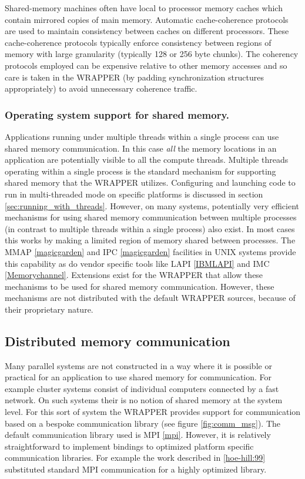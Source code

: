 Shared-memory machines often have local to processor memory caches
which contain mirrored copies of main memory. Automatic cache-coherence
protocols are used to maintain consistency between caches on different
processors. These cache-coherence protocols typically enforce consistency
between regions of memory with large granularity (typically 128 or 256 byte
chunks). The coherency protocols employed can be expensive relative to other
memory accesses and so care is taken in the WRAPPER (by padding synchronization
structures appropriately) to avoid unnecessary coherence traffic.

\subsubsection{Operating system support for shared memory.}

Applications running under multiple threads within a single process can
use shared memory communication. In this case {\it all} the memory locations 
in an application are potentially visible to all the compute threads. Multiple 
threads operating within a single process is the standard mechanism for 
supporting shared memory that the WRAPPER utilizes. Configuring and launching 
code to run in multi-threaded mode on specific platforms is discussed in 
section \ref{sec:running_with_threads}.  However, on many systems, potentially 
very efficient mechanisms for using shared memory communication between 
multiple processes (in contrast to multiple threads within a single 
process) also exist. In most cases this works by making a limited region of 
memory shared between processes. The MMAP \ref{magicgarden} and 
IPC \ref{magicgarden} facilities in UNIX systems provide this capability as do 
vendor specific tools like LAPI \ref{IBMLAPI} and IMC \ref{Memorychannel}. 
Extensions exist for the WRAPPER that allow these mechanisms 
to be used for shared memory communication. However, these mechanisms are not 
distributed with the default WRAPPER sources, because of their proprietary 
nature.

\subsection{Distributed memory communication}
\label{sec:distributed_memory_communication}
Many parallel systems are not constructed in a way where it is
possible or practical for an application to use shared memory
for communication. For example cluster systems consist of individual computers
connected by a fast network. On such systems their is no notion of shared memory
at the system level. For this sort of system the WRAPPER provides support
for communication based on a bespoke communication library 
(see figure \ref{fig:comm_msg}).  The default communication library used is MPI 
\ref{mpi}. However, it is relatively straightforward to implement bindings to 
optimized platform specific communication libraries. For example the work 
described in \ref{hoe-hill:99} substituted standard MPI communication for a 
highly optimized library.

